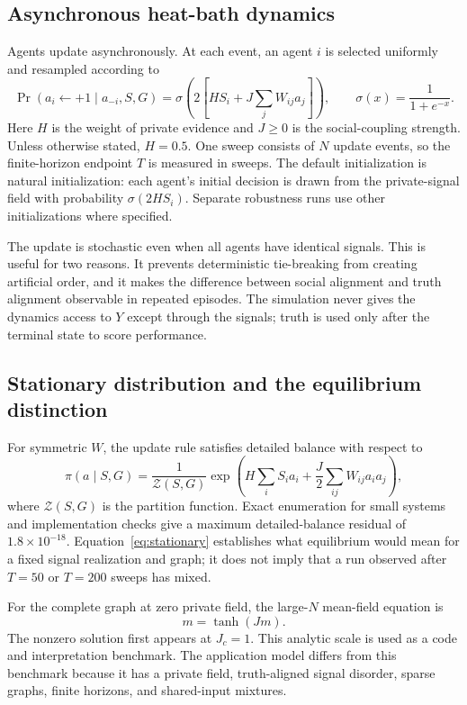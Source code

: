 \documentclass[11pt,a4paper]{article}
\begin{document}
\subsection{Asynchronous heat-bath dynamics}

Agents update asynchronously. At each event, an agent $i$ is selected uniformly and resampled according to
\begin{equation}
\Pr\!\left(a_i\leftarrow+1\mid a_{-i},S,G\right)=
\sigma\!\left(2\left[H S_i+J\sum_jW_{ij}a_j\right]\right),
\qquad \sigma(x)=\frac{1}{1+e^{-x}}.
\label{eq:update}
\end{equation}
Here $H$ is the weight of private evidence and $J\ge0$ is the social-coupling strength. Unless otherwise stated, $H=0.5$. One sweep consists of $N$ update events, so the finite-horizon endpoint $T$ is measured in sweeps. The default initialization is natural initialization: each agent's initial decision is drawn from the private-signal field with probability $\sigma(2HS_i)$. Separate robustness runs use other initializations where specified.

The update is stochastic even when all agents have identical signals. This is useful for two reasons. It prevents deterministic tie-breaking from creating artificial order, and it makes the difference between social alignment and truth alignment observable in repeated episodes. The simulation never gives the dynamics access to $Y$ except through the signals; truth is used only after the terminal state to score performance.

\subsection{Stationary distribution and the equilibrium distinction}

For symmetric $W$, the update rule satisfies detailed balance with respect to
\begin{equation}
\pi(a\mid S,G)=\frac{1}{\mathcal{Z}(S,G)}\exp\!\left(H\sum_iS_i a_i+\frac{J}{2}\sum_{ij}W_{ij}a_i a_j\right),
\label{eq:stationary}
\end{equation}
where $\mathcal{Z}(S,G)$ is the partition function. Exact enumeration for small systems and implementation checks give a maximum detailed-balance residual of $1.8\times10^{-18}$. Equation~\ref{eq:stationary} establishes what equilibrium would mean for a fixed signal realization and graph; it does not imply that a run observed after $T=50$ or $T=200$ sweeps has mixed.

For the complete graph at zero private field, the large-$N$ mean-field equation is
\[
m=\tanh(Jm).
\]
The nonzero solution first appears at $J_c=1$. This analytic scale is used as a code and interpretation benchmark. The application model differs from this benchmark because it has a private field, truth-aligned signal disorder, sparse graphs, finite horizons, and shared-input mixtures.
\end{document}
